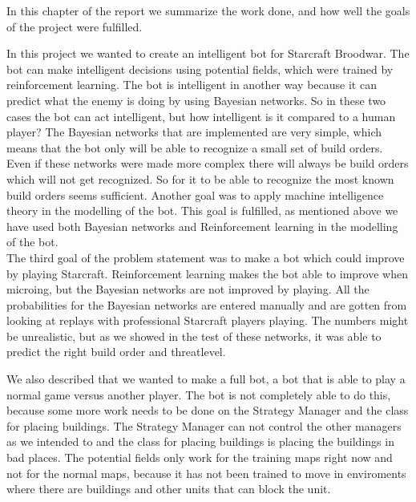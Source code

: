 In this chapter of the report we summarize the work done, and how well the goals of the project were fulfilled.

In this project we wanted to create an intelligent bot for Starcraft Broodwar. The bot can make intelligent decisions using potential fields, which 
were trained by reinforcement learning. The bot is intelligent in another way because it can predict what the enemy is doing by using Bayesian networks. 
So in these two cases the bot can act intelligent, but how intelligent is it compared to a human player? The Bayesian networks that are implemented are 
very simple, which means that the bot only will be able to recognize a small set of build orders. Even if these networks were made more complex there 
will always be build orders which will not get recognized. So for it to be able to recognize the most known build orders seems sufficient. 
Another goal was to apply machine intelligence theory in the modelling of the bot. This goal is fulfilled, as mentioned above we have used both 
Bayesian networks and Reinforcement learning in the modelling of the bot.\\

The third goal of the problem statement was to make a bot which could improve by playing Starcraft. 
Reinforcement learning makes the bot able to improve when microing, but the Bayesian networks are not improved by playing. All the probabilities for the Bayesian networks are entered manually and are gotten from looking at replays with professional Starcraft players playing. The numbers might be unrealistic, 
but as we showed in the test of these networks, it was able to predict the right build order and threatlevel.

We also described that we wanted to make a full bot, a bot that is able to play a normal game versus another player. The bot is not completely able to 
do this, because some more work needs to be done on the Strategy Manager and the class for placing buildings. The Strategy Manager can not control the 
other managers as we intended to and the class for placing buildings is placing the buildings in bad places. The potential fields only work for the 
training maps right now and not for the normal maps, because it has not been trained to move in enviroments where there are buildings and other units that 
can block the unit. 
